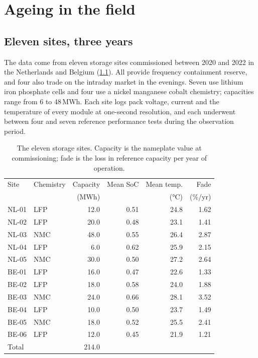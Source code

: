 \chapter{Ageing in the field}
\label{ch:data}

\section{Eleven sites, three years}
\label{sec:sites}

The data come from eleven storage sites commissioned between 2020 and
2022 in the Netherlands and Belgium (\cref{tab:sites}). All provide
frequency containment reserve, and four also trade on the intraday
market in the evenings. Seven use lithium iron phosphate cells and four
use a nickel manganese cobalt chemistry; capacities range from 6 to
48\,MWh. Each site logs pack voltage, current and the temperature of
every module at one-second resolution, and each underwent between four
and seven reference performance tests during the observation period.

\begin{table}[tb]
  \caption[The eleven storage sites]{The eleven storage sites. Capacity
    is the nameplate value at commissioning; fade is the loss in reference
    capacity per year of operation.}
  \label{tab:sites}
  \centering
  \begin{tabular}{@{}l l r r r r@{}}
    \toprule
    Site & Chemistry & Capacity & Mean SoC & Mean temp. & Fade \\
         &           & (MWh)    &          & (°C)       & (\%/yr) \\
    \midrule
    NL-01 & LFP &  12.0 & 0.51 & 24.8 & 1.62 \\
    NL-02 & LFP &  20.0 & 0.48 & 23.1 & 1.41 \\
    NL-03 & NMC &  48.0 & 0.55 & 26.4 & 2.87 \\
    NL-04 & LFP &   6.0 & 0.62 & 25.9 & 2.15 \\
    NL-05 & NMC &  30.0 & 0.50 & 27.2 & 2.64 \\
    BE-01 & LFP &  16.0 & 0.47 & 22.6 & 1.33 \\
    BE-02 & LFP &  18.0 & 0.58 & 24.0 & 1.88 \\
    BE-03 & NMC &  24.0 & 0.66 & 28.1 & 3.52 \\
    BE-04 & LFP &  10.0 & 0.50 & 23.7 & 1.49 \\
    BE-05 & NMC &  18.0 & 0.52 & 25.5 & 2.41 \\
    BE-06 & LFP &  12.0 & 0.45 & 21.9 & 1.21 \\
    \midrule
    Total &     & 214.0 &      &      &      \\
    \bottomrule
  \end{tabular}
\end{table}

